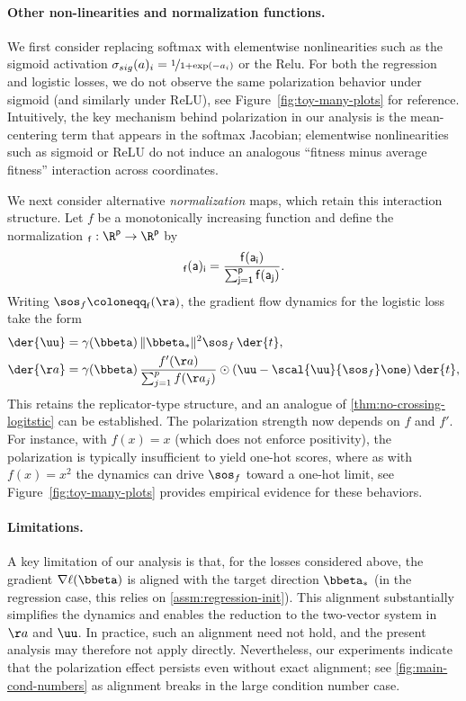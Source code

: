 \documentclass{article}
\theoremstyle{plain}
\theoremstyle{definition}
\theoremstyle{remark}
\begin{document}
\paragraph{Other non-linearities and normalization functions.} 
%
We first consider replacing softmax with elementwise nonlinearities such as the sigmoid activation  $\sigma_{sig}(a)_i = \nicefrac{1}{1 + \exp(-a_i)}$ or the Relu. For both the regression and logistic losses, we do not observe the same polarization behavior under sigmoid (and similarly under ReLU), see Figure~\ref{fig:toy-many-plots} for reference. Intuitively, the key mechanism behind polarization in our analysis is the mean-centering term that appears in the softmax Jacobian; elementwise nonlinearities such as sigmoid or ReLU do not induce an analogous ``fitness minus average fitness'' interaction across coordinates.

We next consider alternative \emph{normalization} maps, which retain this interaction structure. Let $f$ be a monotonically increasing function and define the normalization $\sf_{f}: \R^{p} \to \R^{p}$ by
\begin{align*}
  \sf_{f}(a)_i = \frac{f(a_i)}{\sum_{j=1}^{p} f(a_j)}.
\end{align*}
%
Writing $\sos_f \coloneqq \sf_f(\aa)$, the gradient flow dynamics for the logistic loss take the form
\begin{align*}
  \der{\uu} &=  \gamma(\bbeta) \, \|\bbeta_*\|^2   \sos_{f} \, \der{t}, \\
  \der{\aa} &=  \gamma(\bbeta) \, \frac{f'(\aa)}{\sum_{j=1}^{p} f(\aa_j)} \odot ( \uu - \scal{\uu}{\sos_f} \one ) \, \der{t},
\end{align*}
%
This retains the replicator-type structure, and an analogue of \cref{thm:no-crossing-logitstic} can be established. 
%
The polarization strength now depends on $f$ and $f'$. For instance, with $f(x)=x$ (which does not enforce positivity), the polarization is typically insufficient to yield one-hot scores, where as with $f(x)=x^2$ the dynamics can drive $\sos_f$ toward a one-hot limit, see Figure~\ref{fig:toy-many-plots} provides empirical evidence for these behaviors.
%

\paragraph{Limitations.}
%
A key limitation of our analysis is that, for the losses considered above, the gradient $\nabla \ell(\bbeta)$ is aligned with the target direction $\bbeta_*$ (in the regression case, this relies on \cref{assm:regression-init}). 
%
This alignment substantially simplifies the dynamics and enables the reduction to the two-vector system in $\aa$ and $\uu$. 
%
In practice, such an alignment need not hold, and the present analysis may therefore not apply directly. Nevertheless, our experiments indicate that the polarization effect persists even without exact alignment; see \cref{fig:main-cond-numbers} as alignment breaks in the large condition number case.
 
\end{document}
